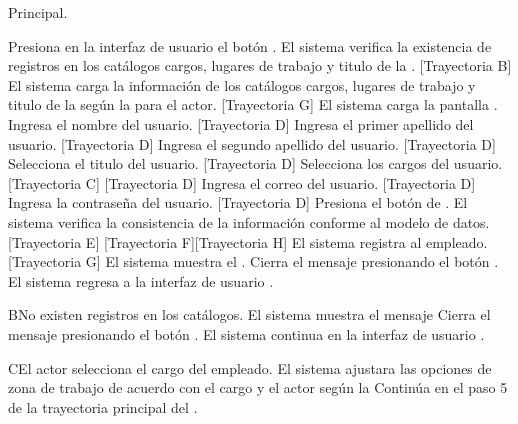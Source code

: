 \begin{UCtrayectoria}{Principal.}
	
	\UCpaso[\UCactor] Presiona en la interfaz de usuario  el botón \IUbutton{+}.
	\UCpaso  El sistema verifica la existencia de registros en los catálogos cargos, lugares de trabajo y titulo de la . [Trayectoria B] 
	\UCpaso El sistema carga la información de los catálogos cargos, lugares de trabajo y titulo de la  según la  para el actor. [Trayectoria G]
	\UCpaso El sistema carga la pantalla  . 
	\UCpaso[\UCactor] Ingresa el nombre del usuario.  [Trayectoria D] 
	\UCpaso[\UCactor] Ingresa el primer apellido del usuario.  [Trayectoria D]
	\UCpaso[\UCactor] Ingresa el segundo apellido del usuario.  [Trayectoria D]  
	\UCpaso[\UCactor] Selecciona el titulo del usuario.  [Trayectoria D]
	\UCpaso[\UCactor] Selecciona los cargos del usuario. [Trayectoria C]  [Trayectoria D] 
	\UCpaso[\UCactor] Ingresa el correo del usuario.  [Trayectoria D] 
	\UCpaso[\UCactor] Ingresa la contraseña del usuario.  [Trayectoria D]
	\UCpaso[\UCactor]  Presiona el botón de . 
	\UCpaso El sistema verifica la consistencia de la información conforme al modelo de datos. [Trayectoria E] [Trayectoria F][Trayectoria H]
	\UCpaso El sistema registra al empleado. [Trayectoria G]
	\UCpaso  El sistema muestra el .    
	\UCpaso[\UCactor] Cierra el mensaje presionando el botón .
	\UCpaso El sistema regresa a la interfaz de usuario .
\end{UCtrayectoria}


\begin{UCtrayectoriaA}{B}{No existen registros en los catálogos.}
	\UCpaso El sistema muestra el mensaje 
	\UCpaso[\UCactor] Cierra el mensaje presionando el botón .
	\UCpaso El sistema continua en la interfaz de usuario .
\end{UCtrayectoriaA}

\begin{UCtrayectoriaA}{C}{El actor selecciona el cargo del empleado.}
	\UCpaso     El sistema ajustara las opciones de zona de trabajo de acuerdo con el cargo y el actor según la 
	\UCpaso Continúa en el paso 5 de la trayectoria principal del .
\end{UCtrayectoriaA}

